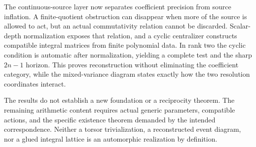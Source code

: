 \documentclass[11pt]{article}
\theoremstyle{definition}
\theoremstyle{remark}
\begin{document}
The continuous-source layer now separates coefficient precision from source inflation. A finite-quotient obstruction can disappear when more of the source is allowed to act, but an actual commutativity relation cannot be discarded. Scalar-depth normalization exposes that relation, and a cyclic centralizer constructs compatible integral matrices from finite polynomial data. In rank two the cyclic condition is automatic after normalization, yielding a complete test and the sharp $2n-1$ horizon. This proves reconstruction without eliminating the coefficient category, while the mixed-variance diagram states exactly how the two resolution coordinates interact.

The results do not establish a new foundation or a reciprocity theorem. The remaining arithmetic content requires actual generic parameters, compatible actions, and the specific existence theorem demanded by the intended correspondence. Neither a torsor trivialization, a reconstructed event diagram, nor a glued integral lattice is an automorphic realization by definition.
\end{document}
